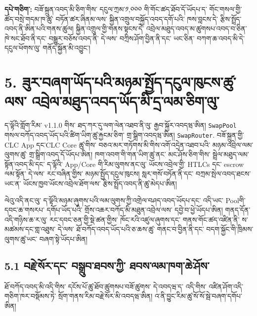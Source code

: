 \documentclass[11pt]{article}
\begin{document}
\textbf{དཔེ་གཅིག་:} བཟོ་སྐྲུན་འབད་མི་ཅིག་གིས་ དངུལ་ཀྲམ་༡,༠༠༠ གི་གོང་ཚད་ཐོབ་དོ་ཡོདཔ་ད་ གོང་གསལ་གྱི་ ཚོད་བསྲེ་གདམ་ཁ་ཚུ་ བཏོན་ཚར་ཞིནམ་ལས་ སྐྱིན་འགྲུལ་བསྐྱོད་འབད་དགོ་པའི་ ཁས་བླངས་དེ་ རྩིས་སྤྲོད་འབད་ནི་ཨིན་པའི་གནས་ཚུལ། སྐྱིན་འགྲུལ་གྱི་གནས་སྟངས་དེ་ འབྲེལ་མཐུད་འབད་མ་ཚུགསཔ་འབད་བ་ཅིན་ ཁེ་སང་ཐོབ་ནི་དང་ བསྒྱུར་བཅོས་འབད་ནི་ དེ་ལས་ བཀྲིས་ཤོག་བྱིན་ནི་དང་ ཡང་ཅིན་ བཀག་ཆ་འབད་མི་དེ་ དངུལ་ཕོགས་ལུ་ གནོད་སྐྱོན་མི་འབྱུང་།


\section*{5. ཟུར་བཞག་ཡོད་པའི་མཉམ་སྤྱོད་དངུལ་ཁུངས་ཚུ་ལས་ འབྲེལ་མཐུད་འབད་ཡོད་མི་དྲ་ལམ་ཅིག་ལུ་}

ད་ལྟོའི་གློག་རིམ་ v1.1.0 གིས་ ཐད་ཀར་དུ་ལག་ལེན་འཐབ་ནི་ལུ་ རྒྱབ་སྐྱོར་འབདཝ་ཨིན། \texttt{SwapPool} གསལ་བཀོད་འབད་ཡོད་པའི་ཚིག་ཡིག་ཚུ་རྐྱངམ་ཅིག་ གྲ་སྒྲིག་འབདཝ་ཨིན། \texttt{SwapRouter}. བཟོ་སྐྲུན་གྱི་ CLC App དང་CLC Core ཚུ་གིས་ བཅའ་མར་གཏོགས་མི་གིས་འགོ་འདྲེན་འཐབ་པའི་ མཉམ་འབྲེལ་ལམ་ལུགས་ཚུ་ གྲ་སྒྲིག་འབད་དོ་ཡོདཔ་ཨིན། ཁག་འབག་གི་གན་ཡིག་ཚུ་ནང་ མང་ཤོས་ཅིག་གིས་ སྦྲེལ་མཐུད་ལམ་སྟོན་འབད་མི་དང་ ད་ལྟོའི་ App/Core གི་རིམ་ལུགས་ནང་ལུ་ ཡོངས་འབྲེལ་གྱི་ HTLCs དང་ escrow ལམ་སྟོན་ དེ་ལས་ རང་བཞིན་གྱིས་ མཉམ་སྤྱོད་དངུལ་ཁུངས། སླར་གསོ་བཏོན་ནི་དང་ བཀྲམ་སྤེལ་འབད་ཐངས་ ཡང་ན་ ཡོངས་ཁྱབ་ཡོངས་འབྲེལ་ཐོག་ལས་ རྩིས་སྤྲོད་འབད་ནི་ཚུ་མེདཔ་ཨིན།

ལེའུ་འདི་ནང་ལུ་ ད་ལྟོའི་མཉམ་ཞུགས་པའི་ལམ་ལུགས་ཀྱི་འགྲེལ་བཤད་འབད་ཡོདཔ་དང་ འདི་ཡང་ Poolགི་དབང་ཆ་གསརཔ་ དགོཔ་ཡོད་པའི་ གྲོས་འཆར་བཀོད་མི་མཐུན་འབྲེལ་ལས་ དབྱེ་བ་ཕྱེ་ཡོདཔ་ཨིན། གནད་དོན་འདི་གཉིས་ཆ་ར་ལུ་ རང་དབང་ཅན་གྱི་སྡེ་ཚན་གྱིས་ ཁོང་རའི་འཛུལ་ཞུགས་དང་ གནས་གོང་ཚད་འཛིན་ནི་ ས་མཚམས་དང་གླ་འཐུས་ དེ་ལས་ ཐོ་བཀོད་འབད་ཡོད་པའི་ཅ་ཆས་ཚུ་ གནང་བ་བྱིན་ནི་དང་ བདག་སྐྱོང་གི་ཁྲིམས་ལུགས་ཚུ་ཡང་ བཞག་སྟེ་ཡོདཔ་ཨིན།

\subsection*{5.1 བརྗེ་སོར་དང་ བསྒྲུབ་ཐབས་ཀྱི་ ཐབས་ལམ་ཁག་ཆེ་ཤོས་}

ཐོ་བཀོད་འབད་མི་འདི་གིས་ དངོས་པོ་ཚུ་ཐོབ་ཚུགསཔ་བཟོ་ཚུགས་ དེ་འབདཝ་ད་ འདི་གིས་ འཛིན་ཤོག་འདི་ གཅིག་ཁར་བསྡོམས་ཏེ་ སྲོག་གནས་རིམ་བརྗེ་སོར་མི་འབདཝ་ཨིན། འ་ནི་བྱུང་རིམ་ཚུ་སོ་སོ་སྦེ་བཞག་དགོཔ་ཨིན།
\end{document}
